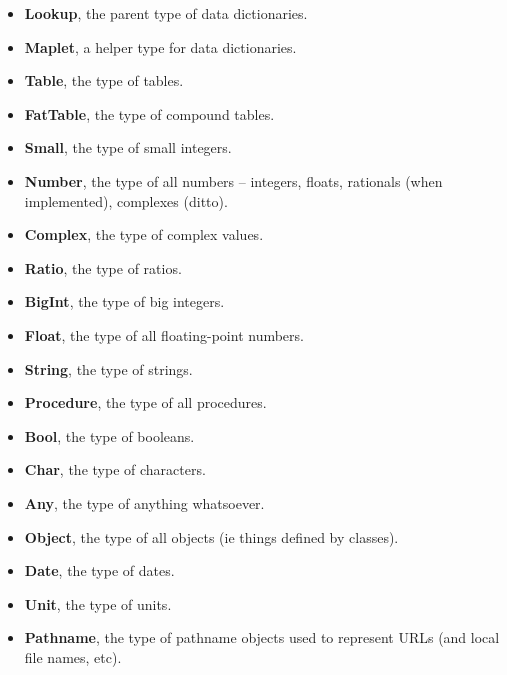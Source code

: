 \documentclass{report}
\begin{document}
\begin{itemize}\item {\bf Lookup}, the parent type of data dictionaries.

\item {\bf Maplet}, a helper type for data dictionaries.

\item {\bf Table}, the type of tables.

\item {\bf FatTable}, the type of compound tables.

\item {\bf Small}, the type of small integers.

\item {\bf Number}, the type of all numbers -- integers, floats, rationals (when
implemented), complexes (ditto).

\item {\bf Complex}, the type of complex values.

\item {\bf Ratio}, the type of ratios.

\item {\bf BigInt}, the type of big integers.

\item {\bf Float}, the type of all floating-point numbers.

\item {\bf String}, the type of strings.

\item {\bf Procedure}, the type of all procedures.

\item {\bf Bool}, the type of booleans.

\item {\bf Char}, the type of characters.

\item {\bf Any}, the type of anything whatsoever.

\item {\bf Object}, the type of all objects (ie things defined by classes).

\item {\bf Date}, the type of dates.

\item {\bf Unit}, the type of units.

\item {\bf Pathname}, the type of pathname objects used to represent URLs (and local
file names, etc).

\end{itemize}\appendix
\end{document}
